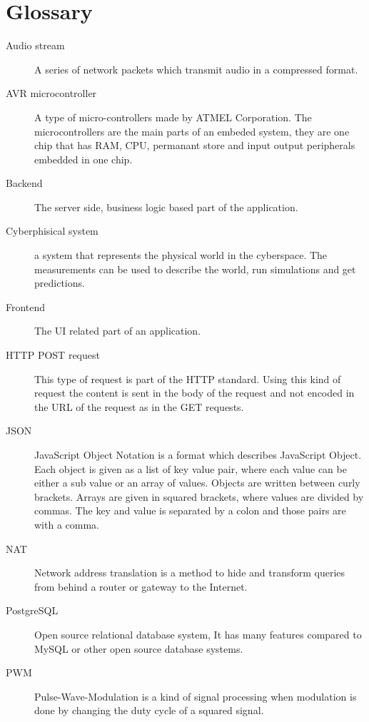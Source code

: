 \section{Glossary}
\begin{description}
	\item[Audio stream] A series of network packets which transmit audio in a compressed format.
	\item[AVR microcontroller] A type of micro-controllers made by ATMEL Corporation. The microcontrollers are the main parts of an embeded system, they are one chip that has RAM, CPU, permanant store and input output peripherals embedded in one chip.
	
	\item[Backend] The server side, business logic based part of the application.
	
	\item[Cyberphisical system] a system that represents the physical world in the cyberspace. The measurements can be used to describe the world, run simulations and get predictions.
	
	\item[Frontend] The UI related part of an application.
	
	\item[HTTP POST request] This type of request is part of the HTTP standard. Using this kind of request the content is sent in the body of the request and not encoded in the URL of the request as in the GET requests.
	
	\item[JSON] JavaScript Object Notation is a format which describes JavaScript Object. Each object is given as a list of key value pair, where each value can be either a sub value or an array of values. Objects are written between curly brackets. Arrays are given in squared brackets, where values are divided by commas. The key and value is separated by a colon and those pairs are with a comma.
	
	\item[NAT] Network address translation is a method to hide and transform queries from behind a router or gateway to the Internet.
	
	\item[PostgreSQL] Open source relational database system, It has many features compared to MySQL or other open source database systems.
	
	\item[PWM] Pulse-Wave-Modulation is a kind of signal processing when modulation is done by changing the duty cycle of a squared signal. 
\end{description}
